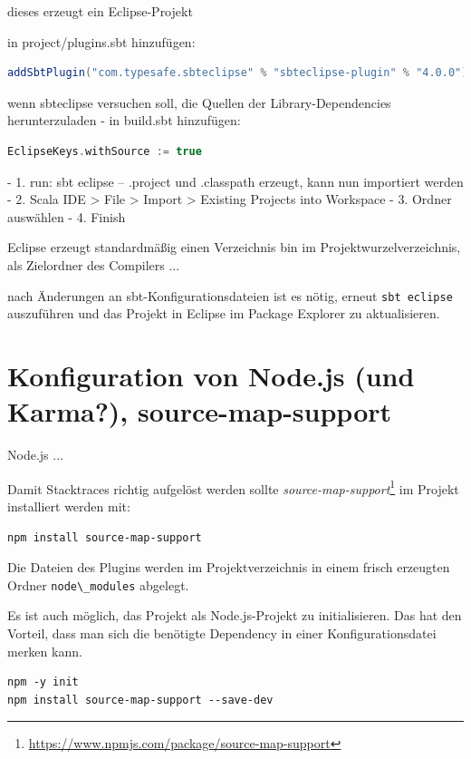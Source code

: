 \documentclass[a4paper, 12pt, hidelinks, listof=totoc, listoftables=totoc, bibliography=totoc]{scrreprt}
\newcommand{\code}[1]{\lstinline[language=Scala, style=inline]|#1|}
\begin{document}
dieses erzeugt ein Eclipse-Projekt

in project/plugins.sbt hinzufügen:
\begin{lstlisting}[language=Scala, style=snippet]
addSbtPlugin("com.typesafe.sbteclipse" % "sbteclipse-plugin" % "4.0.0")
\end{lstlisting}

wenn sbteclipse versuchen soll, die Quellen der Library-Dependencies herunterzuladen - in build.sbt hinzufügen:

\begin{lstlisting}[language=Scala, style=snippet]
EclipseKeys.withSource := true
\end{lstlisting}



- 1. run:
  sbt eclipse  --  .project und .classpath erzeugt, kann nun importiert werden
- 2. Scala IDE > File > Import > Existing Projects into Workspace
- 3. Ordner auswählen
- 4. Finish


Eclipse erzeugt standardmäßig einen Verzeichnis bin im Projektwurzelverzeichnis, als Zielordner des Compilers ...

nach Änderungen an sbt-Konfigurationsdateien ist es nötig, erneut \code{sbt eclipse} auszuführen und das Projekt in Eclipse im Package Explorer zu aktualisieren.






\section{Konfiguration von Node.js (und Karma?), source-map-support}

Node.js ...

Damit Stacktraces richtig aufgelöst werden sollte \textit{source-map-support}\footnote{\url{https://www.npmjs.com/package/source-map-support}} im Projekt installiert werden mit:

\begin{lstlisting}[style=snippet]
npm install source-map-support
\end{lstlisting}

Die Dateien des Plugins werden im Projektverzeichnis in einem frisch erzeugten Ordner \code{node\_modules} abgelegt.

Es ist auch möglich, das Projekt als Node.js-Projekt zu initialisieren. Das hat den Vorteil, dass man sich die benötigte Dependency in einer Konfigurationsdatei merken kann.

\begin{lstlisting}[style=snippet]
npm -y init
npm install source-map-support --save-dev
\end{lstlisting}
\end{document}
